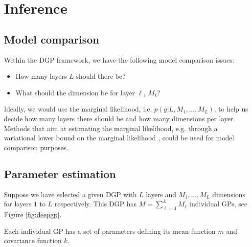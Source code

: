 \documentclass{article}
\begin{document}
\section{Inference}

\subsection{Model comparison}

Within the DGP framework,
we have the following model comparison issues:

\begin{itemize}
\item How many layers $L$ should there be?
\item What should the dimension be for layer $\ell$, $M_\ell$?
\end{itemize}
Ideally, we would use the marginal likelihood, 
i.e. $p(y|L,M_1,\ldots,M_L)$, to help us decide how many layers there should be
and how many dimensions per layer.
Methods that aim at estimating the marginal likelihood,
e.g. through a variational lower bound on the marginal likelihood \citep{damianou2013deep},
could be used for model comparison purposes.

\subsection{Parameter estimation}

Suppose we have selected a given DGP with $L$ layers and $M_1,\ldots,M_L$ 
dimensions for layers $1$ to $L$ respectively.
This DGP has $M=\sum_{\ell=1}^L M_\ell$ individual GPs, 
see Figure \ref{fig:deepgp}.

Each individual GP has a set of parameters defining its mean function $m$ and 
covariance function $k$. 



\end{document}
